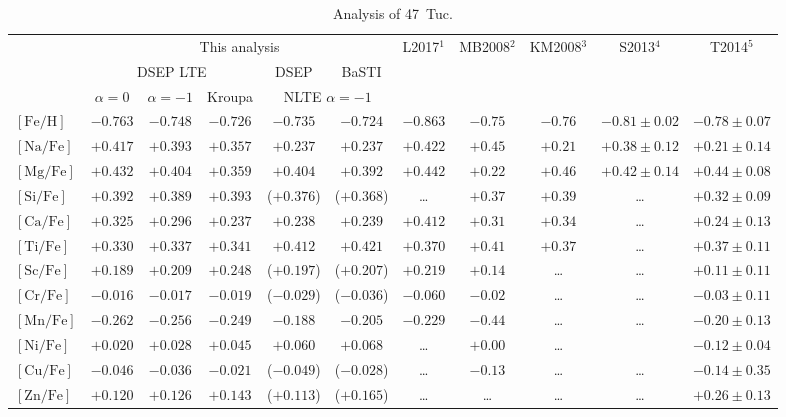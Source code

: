 \documentclass{aa}
\begin{document}
\begin{table*}
\caption{Analysis of 47~Tuc.}
\label{tab:47tuc}
\centering
{\tiny
\begin{tabular}{l c c c c c c c c c c}
\hline\hline
 & \multicolumn{5}{c}{This analysis}  & L2017$^1$ & MB2008$^2$ & KM2008$^3$ & S2013$^4$ & T2014$^5$ \\
 & \multicolumn{3}{c}{DSEP LTE} & DSEP & BaSTI & \\
 & $\alpha=0$ & $\alpha=-1$ & Kroupa & \multicolumn{2}{c}{NLTE $\alpha=-1$} & & & & \\
\hline
$\mathrm{[Fe/H]}$  & $-0.763$  & $-0.748$ & $-0.726$  & $-0.735$ & $-0.724$ & $-0.863$ & $-0.75$ & $-0.76$ & $-0.81\pm0.02$ & $-0.78\pm0.07$ \\
$\mathrm{[Na/Fe]}$  & $+0.417$  & $+0.393$  & $+0.357$  & $+0.237$ & $+0.237$ & $+0.422$ & $+0.45$ & $+0.21$ & $+0.38\pm0.12$ & $+0.21\pm0.14$ \\
$\mathrm{[Mg/Fe]}$  & $+0.432$  & $+0.404$  & $+0.359$  & $+0.404$ & $+0.392$ & $+0.442$ & $+0.22$ & $+0.46$ & $+0.42\pm0.14$ & $+0.44\pm0.08$ \\
$\mathrm{[Si/Fe]}$  & $+0.392$  & $+0.389$  & $+0.393$  & ($+0.376$) & ($+0.368$) & \ldots & $+0.37$ & $+0.39$ & \ldots & $+0.32\pm0.09$ \\
$\mathrm{[Ca/Fe]}$ & $+0.325$  & $+0.296$ & $+0.237$   & $+0.238$ & $+0.239$ & $+0.412$ & $+0.31$ & $+0.34$ & \ldots & $+0.24\pm0.13$ \\
$\mathrm{[Ti/Fe]}$  & $+0.330$  & $+0.337$  & $+0.341$  & $+0.412$ & $+0.421$ & $+0.370$ & $+0.41$ & $+0.37$ & \ldots & $+0.37\pm0.11$ \\
$\mathrm{[Sc/Fe]}$  & $+0.189$  & $+0.209$  & $+0.248$  & ($+0.197$) & ($+0.207$) & $+0.219$ & $+0.14$ & \ldots & \ldots & $+0.11\pm0.11$ \\
$\mathrm{[Cr/Fe]}$  & $-0.016$  & $-0.017$  &  $-0.019$  & ($-0.029$) & ($-0.036$) & $-0.060$ & $-0.02$ & \ldots & \ldots & $-0.03\pm0.11$ \\
$\mathrm{[Mn/Fe]}$  & $-0.262$  & $-0.256$  & $-0.249$  & $-0.188$ & $-0.205$ & $-0.229$ & $-0.44$ & \ldots & \ldots & $-0.20\pm0.13$ \\
$\mathrm{[Ni/Fe]}$  & $+0.020$  & $+0.028$  & $+0.045$  & $+0.060$ & $+0.068$ & \ldots & $+0.00$ & \ldots & & $-0.12\pm0.04$ \\
$\mathrm{[Cu/Fe]}$ & $-0.046$  & $-0.036$  & $-0.021$  & ($-0.049$) & ($-0.028$) & \ldots & $-0.13$ & \ldots & \ldots & $-0.14\pm0.35$ \\
$\mathrm{[Zn/Fe]}$  & $+0.120$  & $+0.126$  & $+0.143$  & ($+0.113$) & ($+0.165$) & \ldots & \ldots  & \ldots & \ldots & $+0.26\pm0.13$ \\

\end{tabular}}
\end{table*}
\end{document}
